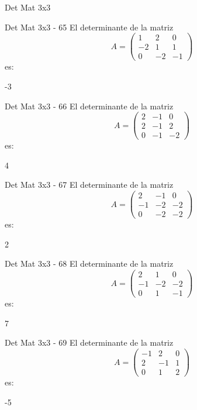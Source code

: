 \documentclass[a4,11pt]{aleph-notas}
\begin{document}
\begin{quiz}{Det Mat 3x3}
\begin{numerical}[tolerance=0]%
    {Det Mat 3x3 - 65}
    El determinante de la matriz
    \[
        A = \begin{pmatrix} 1 & 2 & 0 \\ -2 & 1 & 1 \\ 0 & -2 & -1 \end{pmatrix}
    \]
    es:
    \item[] -3
\end{numerical}

\begin{numerical}[tolerance=0]%
    {Det Mat 3x3 - 66}
    El determinante de la matriz
    \[
        A = \begin{pmatrix} 2 & -1 & 0 \\ 2 & -1 & 2 \\ 0 & -1 & -2 \end{pmatrix}
    \]
    es:
    \item[] 4
\end{numerical}

\begin{numerical}[tolerance=0]%
    {Det Mat 3x3 - 67}
    El determinante de la matriz
    \[
        A = \begin{pmatrix} 2 & -1 & 0 \\ -1 & -2 & -2 \\ 0 & -2 & -2 \end{pmatrix}
    \]
    es:
    \item[] 2
\end{numerical}

\begin{numerical}[tolerance=0]%
    {Det Mat 3x3 - 68}
    El determinante de la matriz
    \[
        A = \begin{pmatrix} 2 & 1 & 0 \\ -1 & -2 & -2 \\ 0 & 1 & -1 \end{pmatrix}
    \]
    es:
    \item[] 7
\end{numerical}

\begin{numerical}[tolerance=0]%
    {Det Mat 3x3 - 69}
    El determinante de la matriz
    \[
        A = \begin{pmatrix} -1 & 2 & 0 \\ 2 & -1 & 1 \\ 0 & 1 & 2 \end{pmatrix}
    \]
    es:
    \item[] -5
\end{numerical}


\end{quiz}
\end{document}
